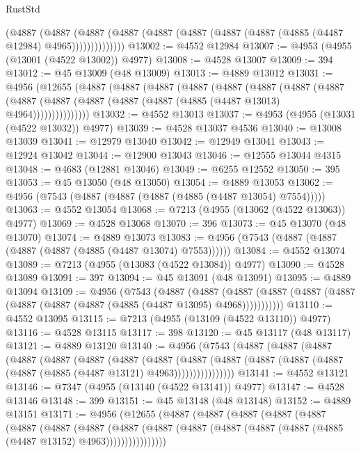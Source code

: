 \begin{lexlean}{RustStd}
\begin{coremodule}
              (@4887
                (@4887
                  (@4887
                    (@4887 (@4887 (@4887 (@4887 (@4887 (@4885 (@4487 @12984) @4965))))))))))))))
@13002 := @4552 @12984
@13007 := @4953 (@4955 (@13001 (@4522 @13002)) @4977)
@13008 := @4528 @13007
@13009 := 394
@13012 := @45 @13009 (@48 @13009)
@13013 := @4889 @13012
@13031 := @4956
    (@12655
      (@4887
        (@4887
          (@4887
            (@4887
              (@4887
                (@4887
                  (@4887
                    (@4887
                      (@4887 (@4887 (@4887 (@4887 (@4887 (@4885 (@4487 @13013) @4964)))))))))))))))
@13032 := @4552 @13013
@13037 := @4953 (@4955 (@13031 (@4522 @13032)) @4977)
@13039 := @4528 @13037 @4536
@13040 := @13008 @13039
@13041 := @12979 @13040
@13042 := @12949 @13041
@13043 := @12924 @13042
@13044 := @12900 @13043
@13046 := @12555 @13044 @4315
@13048 := @4683 (@12881 @13046)
@13049 := @6255 @12552
@13050 := 395
@13053 := @45 @13050 (@48 @13050)
@13054 := @4889 @13053
@13062 := @4956 (@7543 (@4887 (@4887 (@4887 (@4885 (@4487 @13054) @7554)))))
@13063 := @4552 @13054
@13068 := @7213 (@4955 (@13062 (@4522 @13063)) @4977)
@13069 := @4528 @13068
@13070 := 396
@13073 := @45 @13070 (@48 @13070)
@13074 := @4889 @13073
@13083 := @4956 (@7543 (@4887 (@4887 (@4887 (@4887 (@4885 (@4487 @13074) @7553))))))
@13084 := @4552 @13074
@13089 := @7213 (@4955 (@13083 (@4522 @13084)) @4977)
@13090 := @4528 @13089
@13091 := 397
@13094 := @45 @13091 (@48 @13091)
@13095 := @4889 @13094
@13109 := @4956
    (@7543
      (@4887
        (@4887
          (@4887 (@4887 (@4887 (@4887 (@4887 (@4887 (@4887 (@4885 (@4487 @13095) @4968)))))))))))
@13110 := @4552 @13095
@13115 := @7213 (@4955 (@13109 (@4522 @13110)) @4977)
@13116 := @4528 @13115
@13117 := 398
@13120 := @45 @13117 (@48 @13117)
@13121 := @4889 @13120
@13140 := @4956
    (@7543
      (@4887
        (@4887
          (@4887
            (@4887
              (@4887
                (@4887
                  (@4887
                    (@4887
                      (@4887
                        (@4887
                          (@4887 (@4887 (@4887 (@4887 (@4885 (@4487 @13121) @4963))))))))))))))))
@13141 := @4552 @13121
@13146 := @7347 (@4955 (@13140 (@4522 @13141)) @4977)
@13147 := @4528 @13146
@13148 := 399
@13151 := @45 @13148 (@48 @13148)
@13152 := @4889 @13151
@13171 := @4956
    (@12655
      (@4887
        (@4887
          (@4887
            (@4887
              (@4887
                (@4887
                  (@4887
                    (@4887
                      (@4887
                        (@4887
                          (@4887 (@4887 (@4887 (@4887 (@4885 (@4487 @13152) @4963))))))))))))))))

\end{coremodule}
\end{lexlean}
